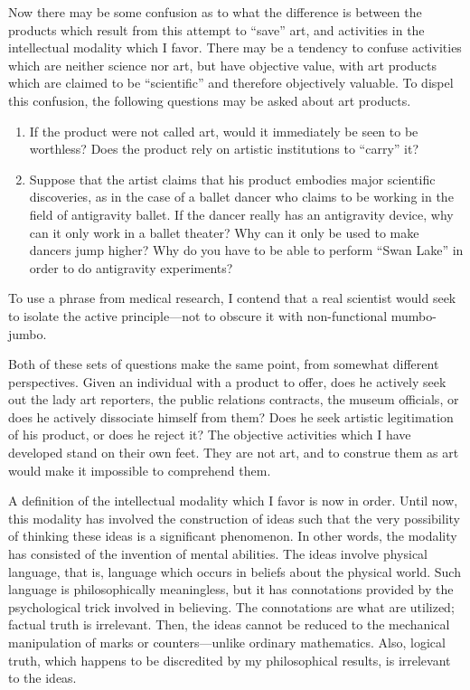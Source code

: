 Now there may be some confusion as to what the difference is between 
the products which result from this attempt to \enquote{save} art, and activities in 
the intellectual modality which I favor. There may be a tendency to confuse 
activities which are neither science nor art, but have objective value, with art 
products which are claimed to be \enquote{scientific} and therefore objectively 
valuable. To dispel this confusion, the following questions may be asked 
about art products. 
\begin{enumerate}[itemsep=3pt, parsep=0pt, topsep=3pt, leftmargin=1cm]
\item If the product were not called art, would it immediately be seen to be 
worthless? Does the product rely on artistic institutions to \enquote{carry} it? 

\item Suppose that the artist claims that his product embodies major scientific 
discoveries, as in the case of a ballet dancer who claims to be working in the 
field of antigravity ballet. If the dancer really has an antigravity device, 
why can it only work in a ballet theater? Why can it 
only be used to make dancers jump higher? Why do you have to be able to 
perform \enquote{Swan Lake} in order to do antigravity experiments? 
\end{enumerate}
To use a phrase from medical research, I contend that a real scientist would seek to 
isolate the active principle---not to obscure it with non-functional mumbo-jumbo. 

Both of these sets of questions make the same point, from somewhat 
different perspectives. Given an individual with a product to offer, does he 
actively seek out the lady art reporters, the public relations contracts, the 
museum officials, or does he actively dissociate himself from them? Does he 
seek artistic legitimation of his product, or does he reject it? The objective 
activities which I have developed stand on their own feet. They are not art, 
and to construe them as art would make it impossible to comprehend them. 

A definition of the intellectual modality which I favor is now in order. 
Until now, this modality has involved the construction of ideas such that the 
very possibility of thinking these ideas is a significant phenomenon. In other 
words, the modality has consisted of the invention of mental abilities. The 
ideas involve physical language, that is, language which occurs in beliefs 
about the physical world. Such language is philosophically meaningless, but 
it has connotations provided by the psychological trick involved in believing. 
The connotations are what are utilized; factual truth is irrelevant. Then, the 
ideas cannot be reduced to the mechanical manipulation of marks or 
counters---unlike ordinary mathematics. Also, logical truth, which happens to 
be discredited by my philosophical results, is irrelevant to the ideas. 

